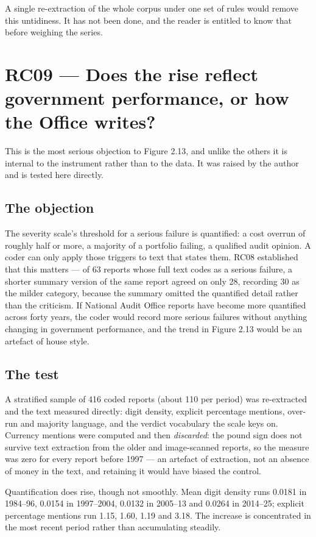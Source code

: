 A single re-extraction of the whole corpus under one set of rules would remove this untidiness.
It has not been done, and the reader is entitled to know that before weighing the series.

\section{RC09 --- Does the rise reflect government performance, or how the Office writes?}

This is the most serious objection to Figure 2.13, and unlike the others it is internal to the
instrument rather than to the data. It was raised by the author and is tested here directly.

\subsection*{The objection}

The severity scale's threshold for a serious failure is quantified: a cost overrun of roughly
half or more, a majority of a portfolio failing, a qualified audit opinion. A coder can only
apply those triggers to text that states them. RC08 established that this matters --- of 63
reports whose full text codes as a serious failure, a shorter summary version of the same report
agreed on only 28, recording 30 as the milder category, because the summary omitted the
quantified detail rather than the criticism. If National Audit Office reports have become more
quantified across forty years, the coder would record more serious failures without anything
changing in government performance, and the trend in Figure 2.13 would be an artefact of house
style.

\subsection*{The test}

A stratified sample of 416 coded reports (about 110 per period) was re-extracted and the text
measured directly: digit density, explicit percentage mentions, over-run and majority language,
and the verdict vocabulary the scale keys on. Currency mentions were computed and then
\emph{discarded}: the pound sign does not survive text extraction from the older and
image-scanned reports, so the measure was zero for every report before 1997 --- an artefact of
extraction, not an absence of money in the text, and retaining it would have biased the control.

Quantification does rise, though not smoothly. Mean digit density runs 0.0181 in 1984--96,
0.0154 in 1997--2004, 0.0132 in 2005--13 and 0.0264 in 2014--25; explicit percentage mentions run
1.15, 1.60, 1.19 and 3.18. The increase is concentrated in the most recent period rather than
accumulating steadily.

